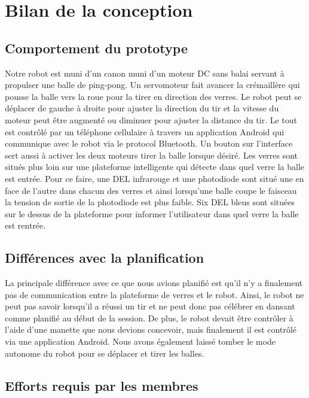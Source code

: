\section{Bilan de la conception}

\subsection{Comportement du prototype}

Notre robot est muni d’un canon muni d’un moteur DC sans balai servant à propulser une balle de ping-pong.
Un servomoteur fait avancer la crémaillère qui pousse la balle vers la roue pour la tirer en direction des verres.
Le robot peut se déplacer de gauche à droite pour ajuster la direction du tir et la vitesse du moteur peut être augmenté ou diminuer pour ajuster la distance du tir.
Le tout est contrôlé par un téléphone cellulaire à travers un application Android qui communique avec le robot via le protocol Bluetooth.
Un bouton sur l’interface sert aussi à activer les deux moteurs tirer la balle lorsque désiré.
Les verres sont situés plus loin sur une plateforme intelligente qui détecte dans quel verre la balle est entrée.
Pour ce faire, une DEL infrarouge et une photodiode sont situé une en face de l’autre dans chacun des verres et ainsi lorsqu’une balle coupe le faisceau la tension de sortie de la photodiode est plus faible.
Six DEL bleus sont situées sur le dessus de la plateforme pour informer l’utilisateur dans quel verre la balle est rentrée.

\subsection{Différences avec la planification}

La principale différence avec ce que nous avions planifié est qu’il n’y a finalement pas de communication entre la plateforme de verres et le robot.
Ainsi, le robot ne peut pas savoir lorsqu’il a réussi un tir et ne peut donc pas célébrer en dansant comme planifié au début de la session.
De plus, le robot devait être contrôler à l’aide d’une manette que nous devions concevoir, mais finalement il est contrôlé via une application Android.
Nous avons également laissé tomber le mode autonome du robot pour se déplacer et tirer les balles.

\subsection{Efforts requis par les membres}

